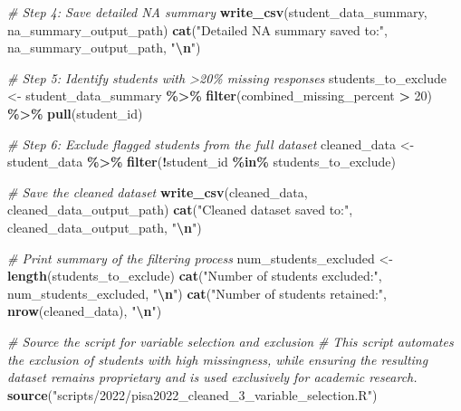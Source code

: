 \documentclass[
]{article}
\newenvironment{Shaded}{\begin{snugshade}}{\end{snugshade}}
\newcommand{\CommentTok}[1]{\textcolor[rgb]{0.56,0.35,0.01}{\textit{#1}}}
\newcommand{\DecValTok}[1]{\textcolor[rgb]{0.00,0.00,0.81}{#1}}
\newcommand{\FunctionTok}[1]{\textcolor[rgb]{0.13,0.29,0.53}{\textbf{#1}}}
\newcommand{\NormalTok}[1]{#1}
\newcommand{\OtherTok}[1]{\textcolor[rgb]{0.56,0.35,0.01}{#1}}
\newcommand{\SpecialCharTok}[1]{\textcolor[rgb]{0.81,0.36,0.00}{\textbf{#1}}}
\newcommand{\StringTok}[1]{\textcolor[rgb]{0.31,0.60,0.02}{#1}}
\begin{document}
\begin{Shaded}
\begin{Highlighting}[]
\CommentTok{\# Step 4: Save detailed NA summary}
\FunctionTok{write\_csv}\NormalTok{(student\_data\_summary, na\_summary\_output\_path)}
\FunctionTok{cat}\NormalTok{(}\StringTok{"Detailed NA summary saved to:"}\NormalTok{, na\_summary\_output\_path, }\StringTok{"}\SpecialCharTok{\textbackslash{}n}\StringTok{"}\NormalTok{)}

\CommentTok{\# Step 5: Identify students with \textgreater{}20\% missing responses}
\NormalTok{students\_to\_exclude }\OtherTok{\textless{}{-}}\NormalTok{ student\_data\_summary }\SpecialCharTok{\%\textgreater{}\%}
  \FunctionTok{filter}\NormalTok{(combined\_missing\_percent }\SpecialCharTok{\textgreater{}} \DecValTok{20}\NormalTok{) }\SpecialCharTok{\%\textgreater{}\%}
  \FunctionTok{pull}\NormalTok{(student\_id)}

\CommentTok{\# Step 6: Exclude flagged students from the full dataset}
\NormalTok{cleaned\_data }\OtherTok{\textless{}{-}}\NormalTok{ student\_data }\SpecialCharTok{\%\textgreater{}\%}
  \FunctionTok{filter}\NormalTok{(}\SpecialCharTok{!}\NormalTok{student\_id }\SpecialCharTok{\%in\%}\NormalTok{ students\_to\_exclude)}

\CommentTok{\# Save the cleaned dataset}
\FunctionTok{write\_csv}\NormalTok{(cleaned\_data, cleaned\_data\_output\_path)}
\FunctionTok{cat}\NormalTok{(}\StringTok{"Cleaned dataset saved to:"}\NormalTok{, cleaned\_data\_output\_path, }\StringTok{"}\SpecialCharTok{\textbackslash{}n}\StringTok{"}\NormalTok{)}

\CommentTok{\# Print summary of the filtering process}
\NormalTok{num\_students\_excluded }\OtherTok{\textless{}{-}} \FunctionTok{length}\NormalTok{(students\_to\_exclude)}
\FunctionTok{cat}\NormalTok{(}\StringTok{"Number of students excluded:"}\NormalTok{, num\_students\_excluded, }\StringTok{"}\SpecialCharTok{\textbackslash{}n}\StringTok{"}\NormalTok{)}
\FunctionTok{cat}\NormalTok{(}\StringTok{"Number of students retained:"}\NormalTok{, }\FunctionTok{nrow}\NormalTok{(cleaned\_data), }\StringTok{"}\SpecialCharTok{\textbackslash{}n}\StringTok{"}\NormalTok{)}
\end{Highlighting}
\end{Shaded}

\begin{Shaded}
\begin{Highlighting}[]
\CommentTok{\# Source the script for variable selection and exclusion}
\CommentTok{\# This script automates the exclusion of students with high missingness, while ensuring the resulting dataset remains proprietary and is used exclusively for academic research.}
\FunctionTok{source}\NormalTok{(}\StringTok{"scripts/2022/pisa2022\_cleaned\_3\_variable\_selection.R"}\NormalTok{)}
\end{Highlighting}
\end{Shaded}
\end{document}
